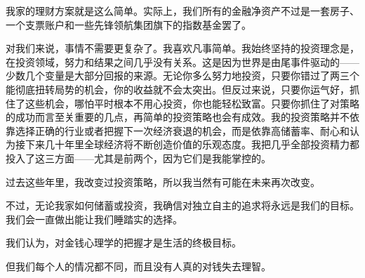 我家的理财方案就是这么简单。实际上，我们所有的金融净资产不过是一套房子、一个支票账户和一些先锋领航集团旗下的指数基金罢了。

对我们来说，事情不需要更复杂了。我喜欢凡事简单。我始终坚持的投资理念是，在投资领域，努力和结果之间几乎没有关系。这是因为世界是由尾事件驱动的——少数几个变量是大部分回报的来源。无论你多么努力地投资，只要你错过了两三个能彻底扭转局势的机会，你的收益就不会太突出。但反过来说，只要你运气好，抓住了这些机会，哪怕平时根本不用心投资，你也能轻松致富。只要你抓住了对策略的成功而言至关重要的几点，再简单的投资策略也会有成效。我的投资策略并不依靠选择正确的行业或者把握下一次经济衰退的机会，而是依靠高储蓄率、耐心和认为接下来几十年里全球经济将不断创造价值的乐观态度。我把几乎全部投资精力都投入了这三方面——尤其是前两个，因为它们是我能掌控的。

过去这些年里，我改变过投资策略，所以我当然有可能在未来再次改变。

不过，无论我家如何储蓄或投资，我确信对独立自主的追求将永远是我们的目标。我们会一直做出能让我们睡踏实的选择。

我们认为，对金钱心理学的把握才是生活的终极目标。

但我们每个人的情况都不同，而且没有人真的对钱失去理智。
